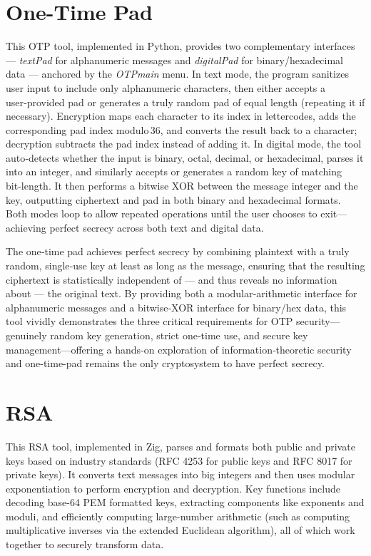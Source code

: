 \documentclass[11pt]{article}
\begin{document}
\begin{multicols}{2}
\begin{spacing}{1.125}
		\section{One-Time Pad}
		This OTP tool, implemented in Python, provides two complementary interfaces
		— \textit{textPad} for alphanumeric messages and \textit{digitalPad} for
		binary/hexadecimal data — anchored by the \textit{OTPmain} menu. In text
		mode, the program sanitizes user input to include only alphanumeric
		characters, then either accepts a user‑provided pad or generates a truly
		random pad of equal length (repeating it if necessary). Encryption maps
		each character to its index in lettercodes, adds the corresponding pad
		index modulo 36, and converts the result back to a character; decryption
		subtracts the pad index instead of adding it. In digital mode, the tool
		auto‑detects whether the input is binary, octal, decimal, or hexadecimal,
		parses it into an integer, and similarly accepts or generates a random key
		of matching bit‑length. It then performs a bitwise XOR between the message
		integer and the key, outputting ciphertext and pad in both binary and
		hexadecimal formats. Both modes loop to allow repeated operations until the
		user chooses to exit—achieving perfect secrecy across both text and digital
		data.

		The one‑time pad achieves perfect secrecy by combining plaintext with a
		truly random, single‑use key at least as long as the message, ensuring that
		the resulting ciphertext is statistically independent of — and thus reveals
		no information about — the original text. By providing both a
		modular‑arithmetic interface for alphanumeric messages and a bitwise‑XOR
		interface for binary/hex data, this tool vividly demonstrates the three
		critical requirements for OTP security—genuinely random key generation,
		strict one‑time use, and secure key management—offering a hands‑on
		exploration of information‑theoretic security and one-time-pad remains the
		only cryptosystem to have perfect secrecy.

		\section{RSA}
		This RSA tool, implemented in Zig, parses and formats both public and
		private keys based on industry standards (RFC 4253 for public keys and RFC
		8017 for private keys). It converts text messages into big integers and
		then uses modular exponentiation to perform encryption and decryption. Key
		functions include decoding base-64 PEM formatted keys, extracting
		components like exponents and moduli, and efficiently computing
		large-number arithmetic (such as computing multiplicative inverses via the
		extended Euclidean algorithm), all of which work together to securely
		transform data.


\end{spacing}
\end{multicols}
\end{document}
